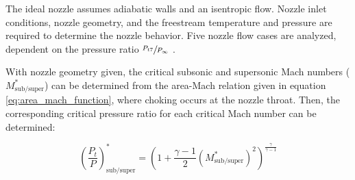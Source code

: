 \documentclass{article}
\begin{document}
The ideal nozzle assumes adiabatic walls and an isentropic flow. Nozzle inlet conditions, nozzle geometry, and the freestream temperature and pressure are required to determine the nozzle behavior. Five nozzle flow cases are analyzed, dependent on the pressure ratio $\sfrac{P_{t7}}{P_{\infty}}$ \cite{cantwell210}.

With nozzle geometry given, the critical subsonic and supersonic Mach numbers ($M_{\textrm{sub/super}}^*$) can be determined from the area-Mach relation given in equation \ref{eq:area_mach_function}, where choking occurs at the nozzle throat. Then, the corresponding critical pressure ratio for each critical Mach number can be determined:

\begin{equation}
\left( \frac{P_t}{P} \right)_{\textrm{sub/super}}^* = \left( 1 + \frac{\gamma - 1}{2} \left(M_{\textrm{sub/super}}^*\right)^2 \right)^\frac{\gamma}{\gamma - 1}
\end{equation}
\end{document}
